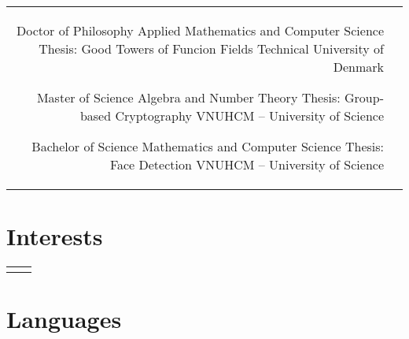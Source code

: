 \documentclass[11pt]{article} %
\begin{document}
\begin{paracol}{2}
\begin{supertabular}{rl}
	{Doctor of Philosophy} %
	{Applied Mathematics and Computer Science} %
    {Thesis: Good Towers of Funcion Fields} %
	{Technical University of Denmark} %
	
	
	{Master of Science} %
	{Algebra and Number Theory} %
    {Thesis: Group-based Cryptography} %
	{VNUHCM -- University of Science} %
	
	
	{Bachelor of Science} %
	{Mathematics and Computer Science} %
    {Thesis: Face Detection} %
	{VNUHCM -- University of Science} %
	

\end{supertabular}


\section{Interests}

\begin{supertabular}{rl} %
	

\end{supertabular}    


\medskip %


\section{Languages}


\end{paracol}
\end{document}
